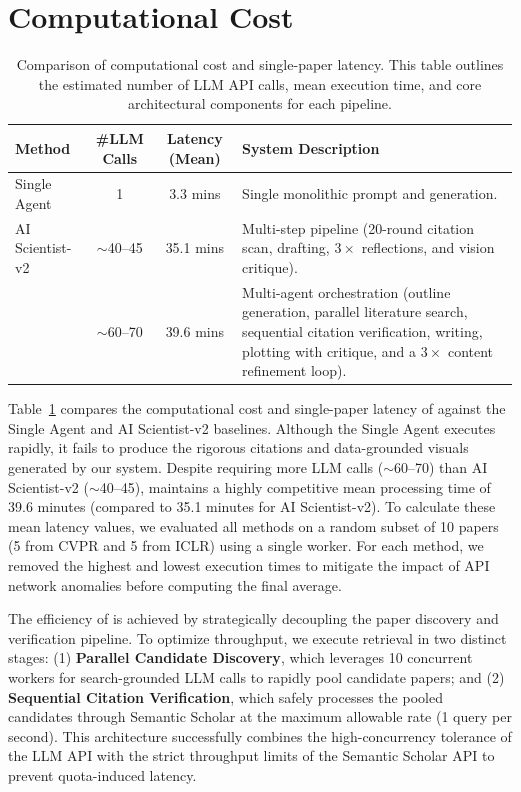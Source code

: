 \section{Computational Cost}
\label{appendix:cost}

\begin{table}[ht]
\centering
\begin{tabular}{lccm{5cm}}
\toprule
\textbf{Method} & \textbf{\#LLM Calls} & \textbf{Latency (Mean)} & \textbf{System Description} \\
\midrule
Single Agent & 1 & 3.3 mins & Single monolithic prompt and generation. \\
\addlinespace
AI Scientist-v2 & $\sim$40--45 & 35.1 mins & Multi-step pipeline (20-round citation scan, drafting, $3\times$ reflections, and vision critique). \\
\addlinespace
\ourmethod{} & $\sim$60--70 & 39.6 mins & Multi-agent orchestration (outline generation, parallel literature search, sequential citation verification, writing, plotting with critique, and a $3\times$ content refinement loop). \\
\bottomrule
\end{tabular}
\caption{Comparison of computational cost and single-paper latency. This table outlines the estimated number of LLM API calls, mean execution time, and core architectural components for each pipeline.}
\label{tab:runtime_efficiency}
\end{table}

Table~\ref{tab:runtime_efficiency} compares the computational cost and single-paper latency of \ourmethod{} against the Single Agent and AI Scientist-v2 baselines. Although the Single Agent executes rapidly, it fails to produce the rigorous citations and data-grounded visuals generated by our system. Despite requiring more LLM calls ($\sim$60--70) than AI Scientist-v2 ($\sim$40--45), \ourmethod{} maintains a highly competitive mean processing time of 39.6 minutes (compared to 35.1 minutes for AI Scientist-v2). To calculate these mean latency values, we evaluated all methods on a random subset of 10 papers (5 from CVPR and 5 from ICLR) using a single worker. For each method, we removed the highest and lowest execution times to mitigate the impact of API network anomalies before computing the final average.

The efficiency of \ourmethod{} is achieved by strategically decoupling the paper discovery and verification pipeline. To optimize throughput, we execute retrieval in two distinct stages: (1) \textbf{Parallel Candidate Discovery}, which leverages 10 concurrent workers for search-grounded LLM calls to rapidly pool candidate papers; and (2) \textbf{Sequential Citation Verification}, which safely processes the pooled candidates through Semantic Scholar at the maximum allowable rate (1 query per second). This architecture successfully combines the high-concurrency tolerance of the LLM API with the strict throughput limits of the Semantic Scholar API to prevent quota-induced latency.

